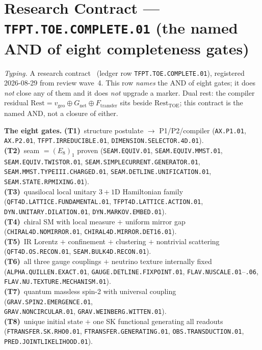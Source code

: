 \section*{Research Contract --- \texttt{TFPT.TOE.COMPLETE.01} (the named AND of eight completeness gates)}
\noindent\emph{Typing.} A research contract \mO\ (ledger row \texttt{TFPT.TOE.COMPLETE.01}),
registered 2026-08-29 from review wave~4.  This row \emph{names} the AND of eight gates; it does
\emph{not} close any of them and it does \emph{not} upgrade a marker.  Dual rest: the compiler
residual $\mathrm{Rest}=v_{\mathrm{geo}}\oplus G_{\mathrm{net}}\oplus F_{\mathrm{transfer}}$ sits
beside $\mathrm{Rest}_{\mathrm{TOE}}$; this contract is the named AND, not a closure of either.

\par\smallskip\noindent\textbf{The eight gates.}
\textbf{(T1)}~structure postulate $\to$ P1/P2/compiler
(\texttt{AX.P1.01}, \texttt{AX.P2.01}, \texttt{TFPT.IRREDUCIBLE.01},
\texttt{DIMENSION.SELECTOR.4D.01}).\\
\textbf{(T2)}~seam $=(E_8)_1$ proven
(\texttt{SEAM.EQUIV.01}, \texttt{SEAM.EQUIV.MMST.01}, \texttt{SEAM.EQUIV.TWISTOR.01},
\texttt{SEAM.SIMPLECURRENT.GENERATOR.01},\\
\texttt{SEAM.MMST.TYPEIII.CHARGED.01},
\texttt{SEAM.DETLINE.UNIFICATION.01},
\texttt{SEAM.STATE.RPMIXING.01}).\\
\textbf{(T3)}~quasilocal local unitary $3{+}1$D Hamiltonian family
(\texttt{QFT4D.LATTICE.FUNDAMENTAL.01}, \texttt{TFPT4D.LATTICE.ACTION.01},
\texttt{DYN.UNITARY.DILATION.01}, \texttt{DYN.MARKOV.EMBED.01}).\\
\textbf{(T4)}~chiral SM with local measure $+$ uniform mirror gap
(\texttt{CHIRAL4D.NOMIRROR.01}, \texttt{CHIRAL4D.MIRROR.DET16.01}).\\
\textbf{(T5)}~IR Lorentz $+$ confinement $+$ clustering $+$ nontrivial scattering
(\texttt{QFT4D.OS.RECON.01}, \texttt{SEAM.BULK4D.RECON.01}).\\
\textbf{(T6)}~all three gauge couplings $+$ neutrino texture internally fixed
(\texttt{ALPHA.QUILLEN.EXACT.01}, \texttt{GAUGE.DETLINE.FIXPOINT.01},
\texttt{FLAV.NUSCALE.01}--\texttt{.06}, \texttt{FLAV.NU.TEXTURE.MECHANISM.01}).\\
\textbf{(T7)}~quantum massless spin-2 with universal coupling
(\texttt{GRAV.SPIN2.EMERGENCE.01},\\
\texttt{GRAV.NONCIRCULAR.01},
\texttt{GRAV.WEINBERG.WITTEN.01}).\\
\textbf{(T8)}~unique initial state $+$ one SK functional generating all readouts
(\texttt{FTRANSFER.SK.RHO0.01}, \texttt{FTRANSFER.GENERATING.01},
\texttt{OBS.TRANSDUCTION.01}, \texttt{PRED.JOINTLIKELIHOOD.01}).

